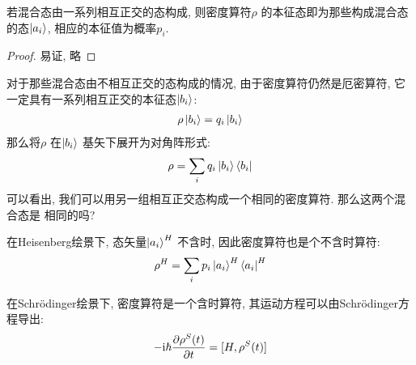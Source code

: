 \begin{theorem}
  若混合态由一系列相互正交的态构成, 则密度算符$\rho$ 的本征态即为那些构成混合态的态$\ket{a_{i}}$,
  相应的本征值为概率$p_{i}$.
\end{theorem}
\begin{proof}
  易证, 略
\end{proof}
\begin{remark}
  对于那些混合态由不相互正交的态构成的情况, 由于密度算符仍然是厄密算符, 它一定具有一系列相互正交的本征态$\ket{b_{i}}$:
  \begin{equation}
    \begin{aligned}
      \rho \ket{b_{i}} = q_{i} \ket{b_{i}}
    \end{aligned}
  \end{equation}
  那么将$\rho$ 在$\ket{b_{i}}$ 基矢下展开为对角阵形式:
  \begin{equation}
    \begin{aligned}
      \rho = \sum_{i} q_{i} \ket{b_{i}}\bra{b_{i}}
    \end{aligned}
  \end{equation}
  可以看出, 我们可以用另一组相互正交态构成一个相同的密度算符. 那么这两个混合态是
  相同的吗?
\end{remark}


在Heisenberg绘景下, 态矢量$\ket{a_{i}}^{H}$ 不含时, 因此密度算符也是个不含时算符:
\begin{equation}
  \begin{aligned}
    \rho^{H} = \sum_{i} p_{i} \ket{a_{i}}^{H}\bra{a_{i}}^{H}
  \end{aligned}
\end{equation}

在Schr\"odinger绘景下, 密度算符是一个含时算符, 其运动方程可以由Schr\"odinger方程导出:
\begin{equation}\label{eq:density_op_Liouville_eq}
  \begin{aligned}
    - {\rm i} \hbar \pdv{\rho^{S}(t)}{t} = [H, \rho^{S}(t)]
  \end{aligned}
\end{equation}


